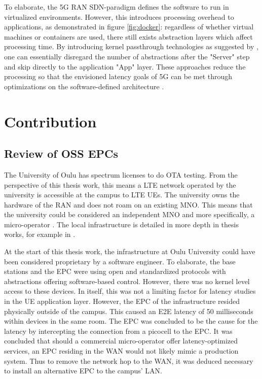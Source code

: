\documentclass[12pt]{article}
\begin{document}
To elaborate, the \gls{5G} \gls{RAN} \gls{SDN}-paradigm defines the software to run in virtualized environments. However, this introduces processing overhead to applications, as demonstrated in figure \ref{fig:docker}: regardless of whether virtual machines or containers are used, there still exists abstraction layers which affect processing time. By introducing kernel passthrough technologies as suggested by \cite{mao2015minimizing}, one can essentially disregard the number of abstractions after the "Server" step and skip directly to the application "App" layer. These approaches reduce the processing so that the envisioned latency goals of \gls{5G} can be met through optimizations on the software-defined architecture \cite{mao2015minimizing}.

\newpage

\section{Contribution}
\label{ch:contribution}

\subsection{Review of OSS EPCs}

The University of Oulu has spectrum licenses to do \gls{OTA} testing. From the perspective of this thesis work, this means a \gls{LTE} network operated by the university is accessible at the campus to \gls{LTE} \glspl{UE}. The university owns the hardware of the \gls{RAN} and does not roam on an existing \gls{MNO}. This means that the university could be considered an independent \gls{MNO} and more specifically, a micro-operator \cite{ahokangas2016future}. The local infrastructure is detailed in more depth in thesis works, for example in \cite{arif2017msc}.

At the start of this thesis work, the infrastructure at Oulu University could have been considered proprietary by a software engineer. To elaborate, the base stations and the \gls{EPC} were using open and standardized protocols with abstractions offering software-based control. However, there was no kernel level access to these devices. In itself, this was not a limiting factor for latency studies in the \gls{UE} application layer. However, the \gls{EPC} of the infrastructure resided physically outside of the campus. This caused an \gls{E2E} latency of 50 milliseconds within devices in the same room. The \gls{EPC} was concluded to be the cause for the latency by intercepting the connection from a picocell to the \gls{EPC}. It was concluded that should a commercial micro-operator offer latency-optimized services, an \gls{EPC} residing in the \gls{WAN} would not likely mimic a production system. Thus to remove the network hop to the \gls{WAN}, it was deduced necessary to install an alternative \gls{EPC} to the campus' \gls{LAN}.
\end{document}
